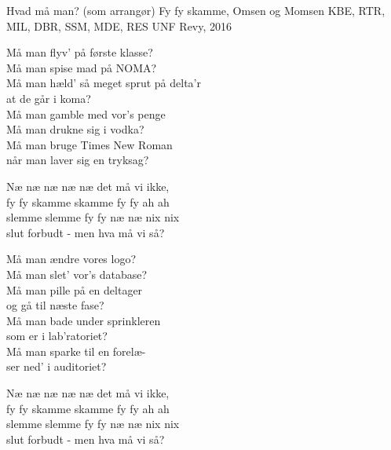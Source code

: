 \begin{song}{Hvad må man? (som arrangør)}
  {} %
  {Fy fy skamme, Omsen og Momsen} %
  {KBE, RTR, MIL, DBR, SSM, MDE, RES} %
  {UNF Revy, 2016} %
  {\NotCCLIed} %

  \begin{SBVerse}
    Må man flyv’ på første klasse?\\
    Må man spise mad på NOMA?\\
    Må man hæld’ så meget sprut på delta’r\\
    at de går i koma?\\\medskip
    Må man gamble med vor’s penge \\
    Må man drukne sig i vodka?\\
    Må man bruge Times New Roman \\
    når man laver sig en tryksag?
  \end{SBVerse}

  \begin{SBChorus}
    Næ næ næ næ næ det må vi ikke,\\
    fy fy skamme skamme fy fy ah ah\\
    slemme slemme fy fy næ næ nix nix\\
    slut forbudt - men hva må vi så?
  \end{SBChorus}

  \begin{SBVerse}
    Må man ændre vores logo?\\
    Må man slet’ vor’s database?\\
    Må man pille på en deltager \\
    og gå til næste fase?\\\medskip
    Må man bade under sprinkleren\\
    som er i lab’ratoriet?\\
    Må man sparke til en forelæ-\\
    ser ned’ i auditoriet?
  \end{SBVerse}

  \begin{SBChorus}
    Næ næ næ næ næ det må vi ikke,\\
    fy fy skamme skamme fy fy ah ah\\
    slemme slemme fy fy næ næ nix nix\\
    slut forbudt - men hva må vi så?
  \end{SBChorus}


\end{song}
